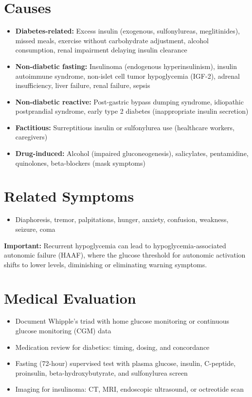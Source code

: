 \section*{Causes}
\begin{itemize}
  \item \textbf{Diabetes-related:} Excess insulin (exogenous, sulfonylureas, meglitinides), missed meals, exercise without carbohydrate adjustment, alcohol consumption, renal impairment delaying insulin clearance
  \item \textbf{Non-diabetic fasting:} Insulinoma (endogenous hyperinsulinism), insulin autoimmune syndrome, non-islet cell tumor hypoglycemia (IGF-2), adrenal insufficiency, liver failure, renal failure, sepsis
  \item \textbf{Non-diabetic reactive:} Post-gastric bypass dumping syndrome, idiopathic postprandial syndrome, early type 2 diabetes (inappropriate insulin secretion)
  \item \textbf{Factitious:} Surreptitious insulin or sulfonylurea use (healthcare workers, caregivers)
  \item \textbf{Drug-induced:} Alcohol (impaired gluconeogenesis), salicylates, pentamidine, quinolones, beta-blockers (mask symptoms)
\end{itemize}

\section*{Related Symptoms}
\begin{itemize}
  \item Diaphoresis, tremor, palpitations, hunger, anxiety, confusion, weakness, seizure, coma
\end{itemize}
\textbf{Important:} Recurrent hypoglycemia can lead to hypoglycemia-associated autonomic failure (HAAF), where the glucose threshold for autonomic activation shifts to lower levels, diminishing or eliminating warning symptoms.

\section*{Medical Evaluation}
\begin{itemize}
  \item Document Whipple's triad with home glucose monitoring or continuous glucose monitoring (CGM) data
  \item Medication review for diabetics: timing, dosing, and concordance
  \item Fasting (72-hour) supervised test with plasma glucose, insulin, C-peptide, proinsulin, beta-hydroxybutyrate, and sulfonylurea screen
  \item Imaging for insulinoma: CT, MRI, endoscopic ultrasound, or octreotide scan
\end{itemize}

